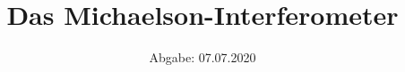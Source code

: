 

\subject{Versuch V401}
\title{Das Michaelson-Interferometer}
\date{%
  Abgabe: 07.07.2020
}



\maketitle
\thispagestyle{empty}
\tableofcontents
\newpage






\newpage
\printbibliography{}


